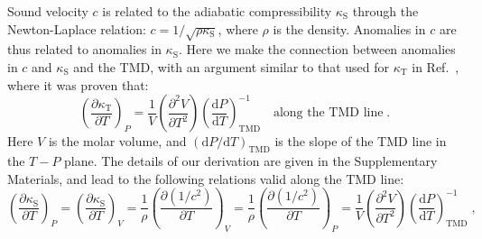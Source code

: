 \documentclass[12pt]{article}
\newcommand{\mrm}{\mathrm}
\newcommand{\kT}{\kappa_\mrm{T}}
\newcommand{\kS}{\kappa_\mrm{S}}
\begin{document}
Sound velocity $c$ is related to the adiabatic compressibility $\kS$ through the Newton-Laplace relation: $c=1/\sqrt{\rho \kS}$, where $\rho$ is the density. Anomalies in $c$ are thus related to anomalies in $\kS$. Here we make the connection between anomalies in $c$ and $\kS$ and the TMD, with an argument similar to that used for $\kT$ in Ref.~\cite{Sastry_singularityfree_1996}, where it was proven that:
\begin{equation}
\left( \frac{\partial \kT}{\partial T} \right)_P = \frac{1}{V} \left(\frac{\partial^2 V}{\partial T^2}\right) \left(\frac{\mrm{d}P}{\mrm{d}T} \right)_\mrm{TMD}^{-1} \quad \textrm{along the TMD line}\; .
\label{eq:Sastry}
\end{equation}
Here $V$ is the molar volume, and $(\mrm{d}P/\mrm{d}T)_\mrm{TMD}$ is the slope of the TMD line in the $T-P$ plane. The details of our derivation are given in the Supplementary Materials, and lead to the following relations valid along the TMD line:
\begin{equation}
\left( \frac{\partial \kS}{\partial T} \right)_P = \left( \frac{\partial \kS}{\partial T} \right)_V = \frac{1}{\rho} \left( \frac{\partial (1/c^2)}{\partial T} \right)_V = \frac{1}{\rho} \left( \frac{\partial (1/c^2)}{\partial T} \right)_P = \frac{1}{V} \left(\frac{\partial^2 V}{\partial T^2}\right) \left(\frac{\mrm{d}P}{\mrm{d}T} \right)_\mrm{TMD}^{-1} \; ,
\label{eq:mastereq}
\end{equation}
\end{document}
